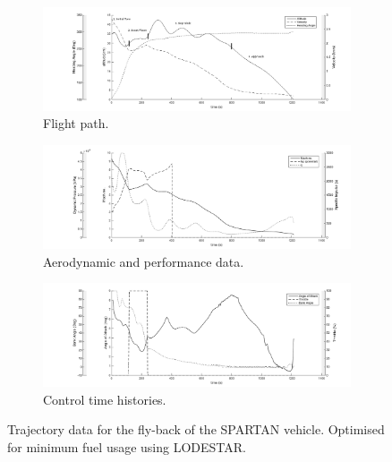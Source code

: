 \documentclass[journal]{new-aiaa} %
\begin{document}
\begin{figure}
\begin{subfigure}[b]{\textwidth}
	\includegraphics[width=\linewidth]{Figures/Traj1}
	\vspace{-15pt}
	\caption{ Flight path.}
	\label{fig:Traj1}
\end{subfigure}

\begin{subfigure}[b]{\textwidth}
	\includegraphics[width=\linewidth]{Figures/Traj2}
	\vspace{-15pt}
	\caption{Aerodynamic and performance data. }
	\label{fig:Traj2}
\end{subfigure}

\begin{subfigure}[b]{\textwidth}
	\includegraphics[width=\linewidth]{Figures/Traj3}
	\vspace{-15pt}
	\caption{Control time histories.}
	\label{fig:Traj3}
\end{subfigure}
\caption{Trajectory data for the fly-back of the SPARTAN vehicle. Optimised for minimum fuel usage using LODESTAR.}
\label{fig:AllTraj}
\end{figure}
\end{document}
